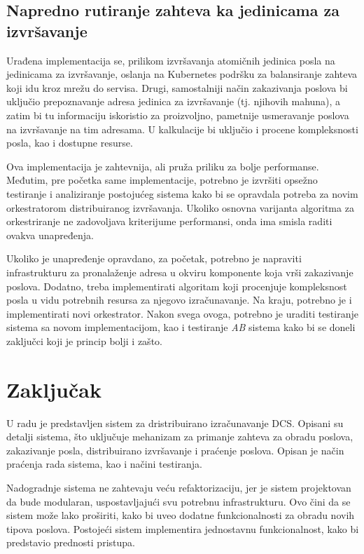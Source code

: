 \documentclass[12pt,oneside]{memoir}
\begin{document}
\subsection{Napredno rutiranje zahteva ka jedinicama za izvršavanje}

Urađena implementacija se, prilikom izvršavanja atomičnih jedinica posla na jedinicama za izvršavanje, oslanja na Kubernetes podršku za balansiranje zahteva koji idu kroz mrežu do servisa. Drugi, samostalniji način zakazivanja poslova bi uključio prepoznavanje adresa jedinica za izvršavanje (tj. njihovih mahuna), a zatim bi tu informaciju iskoristio za proizvoljno, pametnije usmeravanje poslova na izvršavanje na tim adresama. U kalkulacije bi uključio i procene kompleksnosti posla, kao i dostupne resurse.

Ova implementacija je zahtevnija, ali pruža priliku za bolje performanse. Međutim, pre početka same implementacije, potrebno je izvršiti opsežno testiranje i analiziranje postojućeg sistema kako bi se opravdala potreba za novim orkestratorom distribuiranog izvršavanja. Ukoliko osnovna varijanta algoritma za orkestriranje ne zadovoljava kriterijume performansi, onda ima smisla raditi ovakva unapređenja.

Ukoliko je unapređenje opravdano, za početak, potrebno je napraviti infrastrukturu za pronalaženje adresa u okviru komponente koja vrši zakazivanje poslova. Dodatno, treba implementirati algoritam koji procenjuje kompleksnost posla u vidu potrebnih resursa za njegovo izračunavanje. Na kraju, potrebno je i implementirati novi orkestrator. Nakon svega ovoga, potrebno je uraditi testiranje sistema sa novom implementacijom, kao i testiranje \emph{AB} sistema kako bi se doneli zaključci koji je princip bolji i zašto.

\section{Zaključak}
U radu je predstavljen sistem za dristribuirano izračunavanje DCS. Opisani su detalji sistema, što uključuje mehanizam za primanje zahteva za obradu poslova, zakazivanje posla, distribuirano izvršavanje i praćenje poslova. Opisan je način praćenja rada sistema, kao i načini testiranja.

Nadogradnje sistema ne zahtevaju veću refaktorizaciju, jer je sistem projektovan da bude modularan, uspostavljajući svu potrebnu infrastrukturu. Ovo čini da se sistem može lako proširiti, kako bi uveo dodatne funkcionalnosti za obradu novih tipova poslova. Postojeći sistem implementira jednostavnu funkcionalnost, kako bi predstavio prednosti pristupa.
\end{document}

